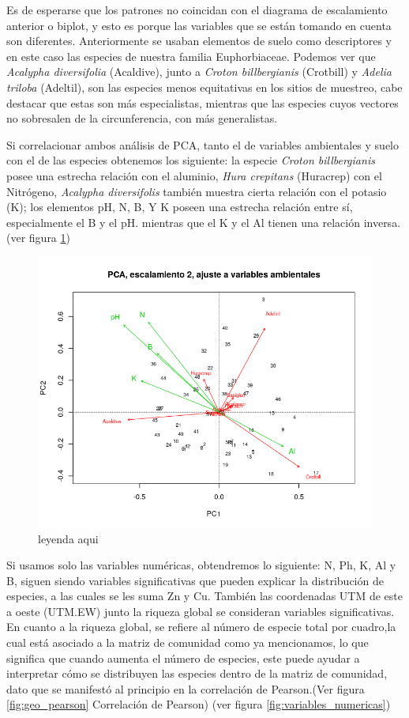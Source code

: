 \documentclass[11pt,]{article}
\begin{document}
Es de esperarse que los patrones no coincidan con el diagrama de
escalamiento anterior o biplot, y esto es porque las variables que se
están tomando en cuenta son diferentes. Anteriormente se usaban
elementos de suelo como descriptores y en este caso las especies de
nuestra familia Euphorbiaceae. Podemos ver que \emph{Acalypha
diversifolia} (Acaldive), junto a \emph{Croton billbergianis} (Crotbill)
y \emph{Adelia triloba} (Adeltil), son las especies menos equitativas en
los sitios de muestreo, cabe destacar que estas son más especialistas,
mientras que las especies cuyos vectores no sobresalen de la
circunferencia, con más generalistas.

Si correlacionar ambos análisis de PCA, tanto el de variables
ambientales y suelo con el de las especies obtenemos los siguiente: la
especie \emph{Croton billbergianis} posee una estrecha relación con el
aluminio, \emph{Hura crepitans} (Huracrep) con el Nitrógeno,
\emph{Acalypha diversifolis} también muestra cierta relación con el
potasio (K); los elementos pH, N, B, Y K poseen una estrecha relación
entre sí, especialmente el B y el pH. mientras que el K y el Al tienen
una relación inversa. (ver figura \ref{fig:suelo_especie})

\begin{figure}
\centering
\includegraphics{suelo_especie.png}
\caption{\label{fig:suelo_especie}leyenda aqui}
\end{figure}

Si usamos solo las variables numéricas, obtendremos lo siguiente: N, Ph,
K, Al y B, siguen siendo variables significativas que pueden explicar la
distribución de especies, a las cuales se les suma Zn y Cu. También las
coordenadas UTM de este a oeste (UTM.EW) junto la riqueza global se
consideran variables significativas. En cuanto a la riqueza global, se
refiere al número de especie total por cuadro,la cual está asociado a la
matriz de comunidad como ya mencionamos, lo que significa que cuando
aumenta el número de especies, este puede ayudar a interpretar cómo se
distribuyen las especies dentro de la matriz de comunidad, dato que se
manifestó al principio en la correlación de Pearson.(Ver figura
\ref{fig:geo_pearson} Correlación de Pearson) (ver figura
\ref{fig:variables_numericas})
\end{document}

